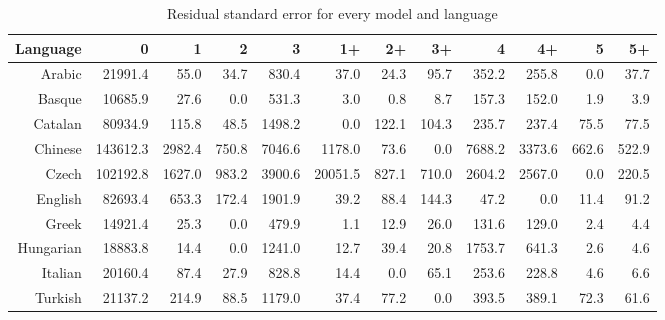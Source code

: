 \documentclass[paper=a4, fontsize=11pt]{scrartcl} %
\begin{document}
\begin{table}
\begin{adjustbox}{center}
\centering
\begin{tabular}{rrrrrrrrrrrr}
 Language & 0 & 1 & 2 & 3 & 1+ & 2+ & 3+ & 4 & 4+ & 5 & 5+ \\ 
  \midrule
Arabic & 21991.4 & 55.0 & 34.7 & 830.4 & 37.0 & 24.3 & 95.7 & 352.2 & 255.8 & 0.0 & 37.7 \\ 
  Basque & 10685.9 & 27.6 & 0.0 & 531.3 & 3.0 & 0.8 & 8.7 & 157.3 & 152.0 & 1.9 & 3.9 \\ 
  Catalan & 80934.9 & 115.8 & 48.5 & 1498.2 & 0.0 & 122.1 & 104.3 & 235.7 & 237.4 & 75.5 & 77.5 \\ 
  Chinese & 143612.3 & 2982.4 & 750.8 & 7046.6 & 1178.0 & 73.6 & 0.0 & 7688.2 & 3373.6 & 662.6 & 522.9 \\ 
  Czech & 102192.8 & 1627.0 & 983.2 & 3900.6 & 20051.5 & 827.1 & 710.0 & 2604.2 & 2567.0 & 0.0 & 220.5 \\ 
  English & 82693.4 & 653.3 & 172.4 & 1901.9 & 39.2 & 88.4 & 144.3 & 47.2 & 0.0 & 11.4 & 91.2 \\ 
  Greek & 14921.4 & 25.3 & 0.0 & 479.9 & 1.1 & 12.9 & 26.0 & 131.6 & 129.0 & 2.4 & 4.4 \\ 
  Hungarian & 18883.8 & 14.4 & 0.0 & 1241.0 & 12.7 & 39.4 & 20.8 & 1753.7 & 641.3 & 2.6 & 4.6 \\ 
  Italian & 20160.4 & 87.4 & 27.9 & 828.8 & 14.4 & 0.0 & 65.1 & 253.6 & 228.8 & 4.6 & 6.6 \\ 
  Turkish & 21137.2 & 214.9 & 88.5 & 1179.0 & 37.4 & 77.2 & 0.0 & 393.5 & 389.1 & 72.3 & 61.6 \\ 
   \bottomrule
\end{tabular}
\end{adjustbox}
\caption{Residual standard error for every model and language}
\end{table}
\end{document}
